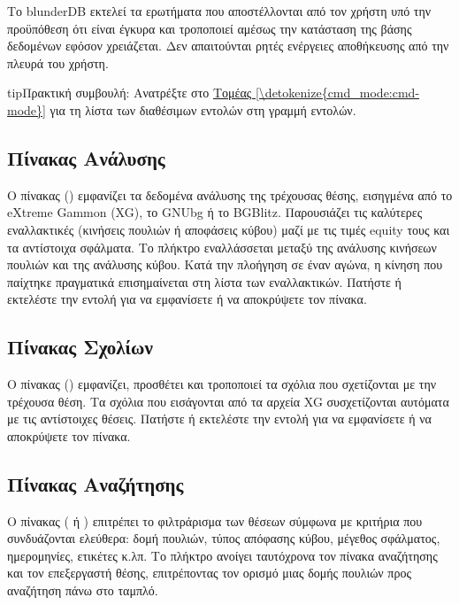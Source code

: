 \documentclass[letterpaper,10pt,greek]{sphinxmanual}
\begin{document}
\sphinxAtStartPar
Το blunderDB εκτελεί τα ερωτήματα που αποστέλλονται από τον χρήστη υπό την προϋπόθεση ότι είναι έγκυρα και τροποποιεί αμέσως την κατάσταση της βάσης δεδομένων εφόσον χρειάζεται. Δεν απαιτούνται ρητές ενέργειες αποθήκευσης από την πλευρά του χρήστη.

\begin{sphinxadmonition}{tip}{Πρακτική συμβουλή:}
\sphinxAtStartPar
Ανατρέξτε στο \hyperref[\detokenize{cmd_mode:cmd-mode}]{Τομέας \ref{\detokenize{cmd_mode:cmd-mode}}} για τη λίστα των διαθέσιμων εντολών στη γραμμή εντολών.
\end{sphinxadmonition}


\subsection{Πίνακας Ανάλυσης}
\label{\detokenize{manuel:panneau-analyse}}\label{\detokenize{manuel:id3}}
\sphinxAtStartPar
Ο πίνακας  () εμφανίζει τα δεδομένα ανάλυσης της τρέχουσας θέσης, εισηγμένα από το eXtreme Gammon (XG), το GNUbg ή το BGBlitz. Παρουσιάζει τις καλύτερες εναλλακτικές (κινήσεις πουλιών ή αποφάσεις κύβου) μαζί με τις τιμές equity τους και τα αντίστοιχα σφάλματα. Το πλήκτρο  εναλλάσσεται μεταξύ της ανάλυσης κινήσεων πουλιών και της ανάλυσης κύβου. Κατά την πλοήγηση σε έναν αγώνα, η κίνηση που παίχτηκε πραγματικά επισημαίνεται στη λίστα των εναλλακτικών. Πατήστε  ή εκτελέστε την εντολή  για να εμφανίσετε ή να αποκρύψετε τον πίνακα.


\subsection{Πίνακας Σχολίων}
\label{\detokenize{manuel:panneau-commentaires}}\label{\detokenize{manuel:id4}}
\sphinxAtStartPar
Ο πίνακας  () εμφανίζει, προσθέτει και τροποποιεί τα σχόλια που σχετίζονται με την τρέχουσα θέση. Τα σχόλια που εισάγονται από τα αρχεία XG συσχετίζονται αυτόματα με τις αντίστοιχες θέσεις. Πατήστε  ή εκτελέστε την εντολή  για να εμφανίσετε ή να αποκρύψετε τον πίνακα.


\subsection{Πίνακας Αναζήτησης}
\label{\detokenize{manuel:panneau-recherche}}\label{\detokenize{manuel:id5}}
\sphinxAtStartPar
Ο πίνακας  ( ή ) επιτρέπει το φιλτράρισμα των θέσεων σύμφωνα με κριτήρια που συνδυάζονται ελεύθερα: δομή πουλιών, τύπος απόφασης κύβου, μέγεθος σφάλματος, ημερομηνίες, ετικέτες κ.λπ. Το πλήκτρο  ανοίγει ταυτόχρονα τον πίνακα αναζήτησης και τον επεξεργαστή θέσης, επιτρέποντας τον ορισμό μιας δομής πουλιών προς αναζήτηση πάνω στο ταμπλό.
\end{document}
